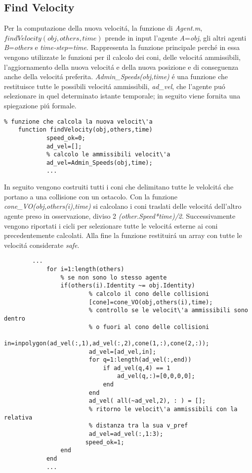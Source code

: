 \subsection{Find Velocity}
Per la computazione della nuova velocit\'a, la funzione di \textit{Agent.m}, \textit{$findVelocity(obj,others,time)$} prende in input l'agente \textit{A}=\textit{obj}, gli altri agenti \textit{B}=\textit{others} e \textit{time-step}=\textit{time}. Rappresenta la funzione principale perch\'e in essa vengono utilizzate le funzioni per il calcolo dei coni, delle velocit\'a ammissibili, l'aggiornamento della nuova velocit\'a e della nuova posizione e di conseguenza anche della velocit\'a preferita.
\textit{Admin\_Speeds(obj,time)} \'e una funzione che restituisce tutte le possibili velocit\'a ammissibili, \textit{ad\_vel}, che l'agente pu\'o selezionare in quel determinato istante temporale; in seguito viene fornita una spiegazione pi\'u formale.
 
\begin{lstlisting}
% funzione che calcola la nuova velocit\'a
    function findVelocity(obj,others,time)
            speed_ok=0;
            ad_vel=[];
            % calcolo le ammissibili velocit\'a
            ad_vel=Admin_Speeds(obj,time);
            ...
 \end{lstlisting}
 
 In seguito vengono costruiti tutti i coni che delimitano tutte le velolcit\'a che portano a una collisione con un ostacolo. Con la funzione
 \textit{cone\_VO(obj,others(i),time)} si calcolano i coni traslati delle velocit\'a dell'altro agente preso in osservazione, diviso 2 \textit{(other.Speed*time)/2}. Successivamente vengono riportati i cicli per selezionare tutte le velocit\'a esterne ai coni precedentemente calcolati.
Alla fine la funzione restituir\'a un array con tutte le velocit\'a considerate \textit{safe}.

 \begin{lstlisting}
	    ...
            for i=1:length(others)
            	% se non sono lo stesso agente
                if(others(i).Identity ~= obj.Identity)
                        % calcolo il cono delle collisioni
                        [cone]=cone_VO(obj,others(i),time); 
                        % controllo se le velocit\'a ammissibili sono dentro
                        % o fuori al cono delle collisioni
                        in=inpolygon(ad_vel(:,1),ad_vel(:,2),cone(1,:),cone(2,:));
                        ad_vel=[ad_vel,in];
                        for q=1:length(ad_vel(:,end))
                            if ad_vel(q,4) == 1
                                ad_vel(q,:)=[0,0,0,0];
                            end
                        end
                        ad_vel( all(~ad_vel,2), : ) = [];                     
                        % ritorno le velocit\'a ammissibili con la relativa
                        % distanza tra la sua v_pref
                        ad_vel=ad_vel(:,1:3);
                       speed_ok=1;
                end    
            end
            ...
\end{lstlisting}
 
